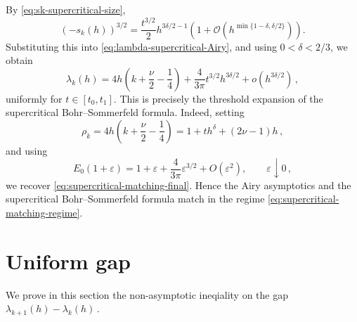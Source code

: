\documentclass[11pt]{amsart}
\numberwithin{equation}{section}
\theoremstyle{remark}
\begin{document}
By \eqref{eq:sk-supercritical-size},
\[
(-s_k(h))^{3/2}
=
\frac{t^{3/2}}{2}
h^{3\delta/2-1}
\left(
1+
\mathcal O\left(
h^{\min\{1-\delta,\delta/2\}}
\right)
\right).
\]
Substituting this into \eqref{eq:lambda-supercritical-Airy}, and using
$0<\delta<2/3$, we obtain
\begin{equation}\label{eq:supercritical-matching-final}
	\lambda_k(h)
	=
	4h\left(
	k+\frac\nu2-\frac14
	\right)
	+
	\frac{4}{3\pi}
	t^{3/2}h^{3\delta/2}
	+
	o(h^{3\delta/2})\,,
\end{equation}
uniformly for $t\in[t_0,t_1]$. This is precisely the threshold expansion of the supercritical
Bohr--Sommerfeld formula. Indeed, setting
\[
\rho_k
=
4h\left(
k+\frac\nu2-\frac14
\right)
=
1+th^\delta+(2\nu-1)h\,,
\]
and using
\[
E_0(1+\varepsilon)
=
1+\varepsilon
+
\frac{4}{3\pi}\varepsilon^{3/2}
+
O(\varepsilon^2),
\qquad
\varepsilon\downarrow0\,,
\]
we recover \eqref{eq:supercritical-matching-final}. Hence the Airy
asymptotics and the supercritical Bohr--Sommerfeld formula match in
the regime \eqref{eq:supercritical-matching-regime}.





\section{Uniform gap}\label{sec:gap}

We prove in this section the non-asymptotic ineqiality on the gap $\lambda_{k+1}(h)-\lambda_k(h)$\,. 
\end{document}
